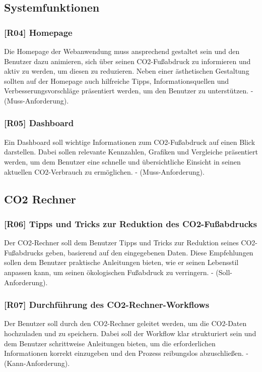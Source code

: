 \subsection{Systemfunktionen}

\subsubsection{[R04] Homepage}

Die Homepage der Webanwendung muss ansprechend gestaltet sein und den Benutzer dazu animieren, sich über seinen CO2-Fußabdruck zu informieren und aktiv zu werden, um diesen zu reduzieren. Neben einer ästhetischen Gestaltung sollten auf der Homepage auch hilfreiche Tipps, Informationsquellen und Verbesserungsvorschläge präsentiert werden, um den Benutzer zu unterstützen. - (Muss-Anforderung).

\subsubsection{[R05] Dashboard}

Ein Dashboard soll wichtige Informationen zum CO2-Fußabdruck auf einen Blick darstellen. Dabei sollen relevante Kennzahlen, Grafiken und Vergleiche präsentiert werden, um dem Benutzer eine schnelle und übersichtliche Einsicht in seinen aktuellen CO2-Verbrauch zu ermöglichen. - (Muss-Anforderung).

\subsection{CO2 Rechner}

\subsubsection{[R06] Tipps und Tricks zur Reduktion des CO2-Fußabdrucks}

Der CO2-Rechner soll dem Benutzer Tipps und Tricks zur Reduktion seines CO2-Fußabdrucks geben, basierend auf den eingegebenen Daten. Diese Empfehlungen sollen dem Benutzer praktische Anleitungen bieten, wie er seinen Lebensstil anpassen kann, um seinen ökologischen Fußabdruck zu verringern. - (Soll-Anforderung).

\subsubsection{[R07] Durchführung des CO2-Rechner-Workflows}

Der Benutzer soll durch den CO2-Rechner geleitet werden, um die CO2-Daten hochzuladen und zu speichern. Dabei soll der Workflow klar strukturiert sein und dem Benutzer schrittweise Anleitungen bieten, um die erforderlichen Informationen korrekt einzugeben und den Prozess reibungslos abzuschließen. - (Kann-Anforderung).

